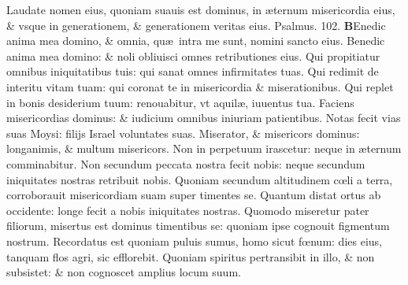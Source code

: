 \documentclass[a5paper,10pt]{book}
\def\ae{æ}
\def\oe{œ}
\begin{document}
\begin{multicols*}{2}
\newline \color{red} L\color{black}audate nomen eius, quoniam suauis est dominus, in \ae ternum misericordia eius, \& vsque in generationem, \& generationem veritas eius. \color{red} Psalmus. 102. \color{black}
\vspace{-1em}
\lettrine[lines=2]{\bfseries \color{red} B}{}Enedic anima mea domino, \& omnia, qu\ae \ intra me sunt, nomini sancto eius.
\newline \color{red} B\color{black}enedic anima mea domino: \& noli obliuisci omnes retributiones eius.
\newline \color{red} Q\color{black}ui propitiatur omnibus iniquitatibus tuis: qui sanat omnes infirmitates tuas.
\newline \color{red} Q\color{black}ui redimit de interitu vitam tuam: qui coronat te in misericordia \& miserationibus.
\newline \color{red} Q\color{black}ui replet in bonis desiderium tuum: renouabitur, vt aquil\ae , iuuentus tua.
\newline \color{red} F\color{black}aciens misericordias dominus: \& iudicium omnibus iniuriam patientibus.
\newline \color{red} N\color{black}otas fecit vias suas Moysi: filijs Israel voluntates suas.
\newline \color{red} M\color{black}iserator, \& misericors dominus: longanimis, \& multum misericors.
\newline \color{red} N\color{black}on in perpetuum irascetur: neque in \ae ternum comminabitur.
\newline \color{red} N\color{black}on secundum peccata nostra fecit nobis: neque secundum iniquitates nostras retribuit nobis.
\newline \color{red} Q\color{black}uoniam secundum altitudinem c\oe li a terra, corroborauit misericordiam suam super timentes se.
\newline \color{red} Q\color{black}uantum distat ortus ab occidente: longe fecit a nobis iniquitates nostras.
\newline \color{red} Q\color{black}uomodo miseretur pater filiorum, misertus est dominus timentibus se: quoniam ipse cognouit figmentum nostrum.
\newline \color{red} R\color{black}ecordatus est quoniam puluis sumus, homo sicut f\oe num: dies eius, tanquam flos agri, sic efflorebit.
\newline \color{red} Q\color{black}uoniam spiritus pertransibit in illo, \& non subsistet: \& non cognoscet amplius locum suum.

\end{multicols*}
\end{document}
